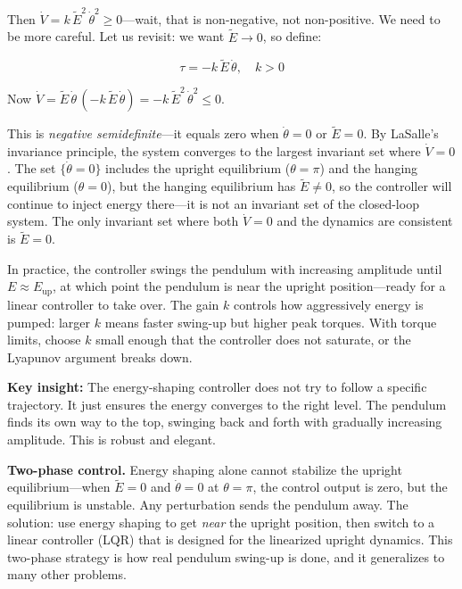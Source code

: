 Then $\dot{V} = k\,\tilde{E}^2\,\dot{\theta}^2 \geq 0$---wait, that is non-negative, not non-positive. We need to be more careful. Let us revisit: we want $\tilde{E} \to 0$, so define:

\begin{equation}
\tau = -k\,\tilde{E}\,\dot{\theta}, \quad k > 0
\end{equation}

Now $\dot{V} = \tilde{E}\,\dot{\theta}\,(-k\,\tilde{E}\,\dot{\theta}) = -k\,\tilde{E}^2\,\dot{\theta}^2 \leq 0$.

This is \textit{negative semidefinite}---it equals zero when $\dot{\theta} = 0$ or $\tilde{E} = 0$. By LaSalle's invariance principle, the system converges to the largest invariant set where $\dot{V} = 0$. The set $\{\dot{\theta} = 0\}$ includes the upright equilibrium ($\theta = \pi$) and the hanging equilibrium ($\theta = 0$), but the hanging equilibrium has $\tilde{E} \neq 0$, so the controller will continue to inject energy there---it is not an invariant set of the closed-loop system. The only invariant set where both $\dot{V} = 0$ and the dynamics are consistent is $\tilde{E} = 0$.

In practice, the controller swings the pendulum with increasing amplitude until $E \approx E_{\text{up}}$, at which point the pendulum is near the upright position---ready for a linear controller to take over. The gain $k$ controls how aggressively energy is pumped: larger $k$ means faster swing-up but higher peak torques. With torque limits, choose $k$ small enough that the controller does not saturate, or the Lyapunov argument breaks down.

\textbf{Key insight:} The energy-shaping controller does not try to follow a specific trajectory. It just ensures the energy converges to the right level. The pendulum finds its own way to the top, swinging back and forth with gradually increasing amplitude. This is robust and elegant.

\textbf{Two-phase control.} Energy shaping alone cannot stabilize the upright equilibrium---when $\tilde{E} = 0$ and $\dot{\theta} = 0$ at $\theta = \pi$, the control output is zero, but the equilibrium is unstable. Any perturbation sends the pendulum away. The solution: use energy shaping to get \textit{near} the upright position, then switch to a linear controller (LQR) that is designed for the linearized upright dynamics. This two-phase strategy is how real pendulum swing-up is done, and it generalizes to many other problems.

